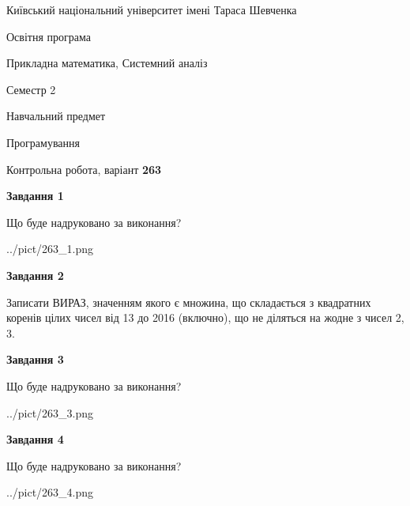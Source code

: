 \documentclass[12pt, ukrainian]{article}
\begin{document}
{{\begin {small}\par
{ \center  Київський національний університет імені Тараса Шевченка \par}
{\parbox {5 cm}{Освітня програма \hfill}{\parbox {8 cm}{Прикладна математика, Системний аналіз \hfill}}\parbox {5 cm}{\hfill Семестр 2}}\par
{\parbox {5 cm} {Навчальний предмет \hfill}\parbox {7 cm}{Програмування \hfill}\parbox {6cm}{\hfill}\par}\vspace{-7pt} \end{small}}{\center Контрольна робота, варіант  \No \textbf
{ 263 }\par}}
{
\begin {large}
{\begin {center}\textbf{Завдання 1}\end {center}}\par
Що буде надруковано за виконання?\par\par
\begin{center}
	{../pict/263_1.png}
\end{center}
\newpage

{\begin {center}\textbf{Завдання 2}\end {center}}\par
Записати ВИРАЗ, значенням якого є множина, що складається з квадратних корен\-ів цілих чисел від 13 до 2016 (включно), що не діляться на жодне з чисел 2, 3.\par
\newpage

{\begin {center}\textbf{Завдання 3}\end {center}}\par
Що буде надруковано за виконання?
\begin{center}
	{../pict/263_3.png}
\end{center}
\newpage

{\begin {center}\textbf{Завдання 4}\end {center}}\par
Що буде надруковано за виконання?\par
\begin{center}
	{../pict/263_4.png}
\end{center}
\newpage


\end{large}}
\end{document}
